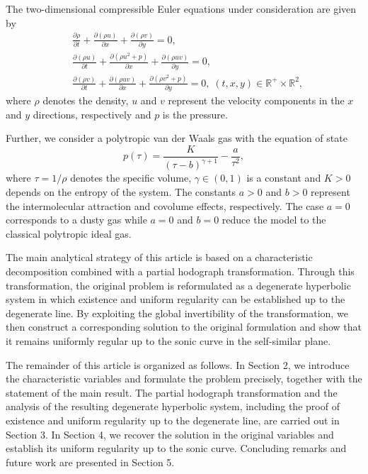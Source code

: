 \documentclass[3p,11pt]{elsarticle}
\numberwithin{equation}{section}
\begin{document}
The two-dimensional compressible Euler equations under consideration are given by \cite{Courant1948}
\begin{equation}\label{int_1}
\begin{split}
    &\frac{\partial \rho}{\partial t}+\frac{\partial(\rho u)}{\partial x}+\frac{\partial (\rho v)}{\partial y}=0,\\
    &\frac{\partial (\rho u)}{\partial t}+\frac{\partial(\rho u^2+p) }{\partial x}+\frac{\partial (\rho uv)}{\partial y}=0,\\
    &\frac{\partial (\rho v)}{\partial t}+\frac{\partial(\rho uv) }{\partial x}+\frac{\partial (\rho v^2+p)}{\partial y}=0, \; (t,x,y) \in \mathbb{R}^+ \times \mathbb{R}^2,
\end{split}
\end{equation}
where $\rho$ denotes the density, $u$ and $v$ represent the velocity components in the $x$ and $y$ directions, respectively and $p$ is the pressure.

Further, we consider a polytropic van der Waals gas with the equation of state \cite{callen1998thermodynamics, Mzafar2025}
\begin{equation}\label{int_2}
p(\tau)=\frac{K}{(\tau-b)^{\gamma+1}}-\frac{a}{\tau^2},
\end{equation}
where $\tau=1/\rho$ denotes the specific volume, $\gamma\in(0,1)$ is a constant and $K>0$ depends on the entropy of the system. The constants $a>0$ and $b>0$ represent the intermolecular attraction and covolume effects, respectively. The case $a=0$ corresponds to a dusty gas while $a=0$ and $b=0$ reduce the model to the classical polytropic ideal gas.

The main analytical strategy of this article is based on a characteristic decomposition combined with a partial hodograph transformation. Through this transformation, the original problem is reformulated as a degenerate hyperbolic system in which existence and uniform regularity can be established up to the degenerate line. By exploiting the global invertibility of the transformation, we then construct a corresponding solution to the original formulation and show that it remains uniformly regular up to the sonic curve in the self-similar plane.

The remainder of this article is organized as follows. In Section 2, we introduce the characteristic variables and formulate the problem precisely, together with the statement of the main result. The partial hodograph transformation and the analysis of the resulting degenerate hyperbolic system, including the proof of existence and uniform regularity up to the degenerate line, are carried out in Section 3. In Section 4, we recover the solution in the original variables and establish its uniform regularity up to the sonic curve. Concluding remarks and future work are presented in Section 5.
\end{document}
